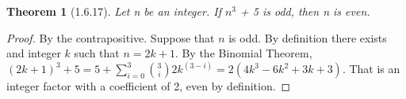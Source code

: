 \documentclass[a4paper, 12pt]{article}
\theoremstyle{plain}
\newtheorem*{theorem*}{Theorem}
\begin{document}
	
	\begin{theorem*}[1.6.17]
		Let n be an integer. If $n^{3}$ + 5 is odd, then n is even.
	\end{theorem*}
	
	\begin{proof}
		By the contrapositive. Suppose that $n$ is odd. By definition there exists and integer $k$ such that $n = 2k + 1$. By the Binomial Theorem, $(2k + 1)^{3} + 5 = 5 + \sum\limits_{i=0}^3 {3 \choose i} 2k^{(3-i)} = 2(4k^{3} - 6k^{2} + 3k + 3)$. That is an integer factor with a coefficient of 2, even by definition.
	\end{proof}
\end{document}
